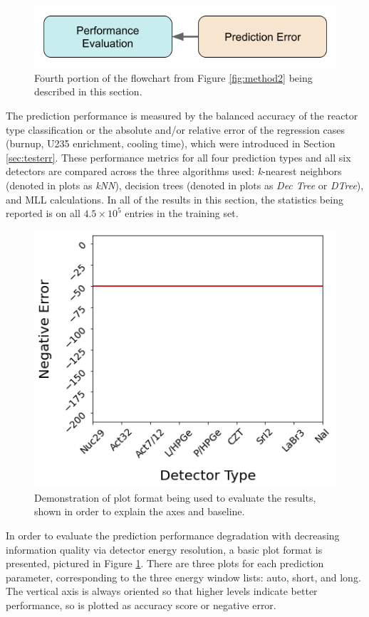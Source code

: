 
\begin{figure}[H]
  \centering
  \includegraphics[width=0.7\linewidth]{./chapters/exp2/methodology2_4.png}
  \caption[Fourth portion of the flowchart from Figure \ref{fig:method2}]
          {Fourth portion of the flowchart from Figure \ref{fig:method2} being 
           described in this section.}
\end{figure}

The prediction performance is measured by the balanced accuracy of the reactor
type classification or the absolute and/or relative error of the regression
cases (burnup, \gls{U235} enrichment, cooling time), which were introduced in
Section \ref{sec:testerr}.  These performance metrics for all four prediction
types and all six detectors are compared across the three algorithms used:
\textit{k}-nearest neighbors (denoted in plots as \textit{kNN}), decision trees
(denoted in plots as \textit{Dec Tree} or \textit{DTree}), and \gls{MLL}
calculations.  In all of the results in this section, the statistics being
reported is on all $4.5 \times 10^5$ entries in the training set.

\begin{figure}[!htb]
  \centering
  \includegraphics[width=0.5\linewidth]{./chapters/exp2/exp2_plot_description.png}
  \caption[Demonstration of plot being used to evaluate the results]
          {Demonstration of plot format being used to evaluate the results, 
           shown in order to explain the axes and baseline.}
  \label{fig:detdemo}
\end{figure}

In order to evaluate the prediction performance degradation with decreasing
information quality via detector energy resolution, a basic plot format is
presented, pictured in Figure \ref{fig:detdemo}.  There are three plots for
each prediction parameter, corresponding to the three energy window lists:
auto, short, and long.  The vertical axis is always oriented so that higher
levels indicate better performance, so is plotted as accuracy score or negative
error.  

